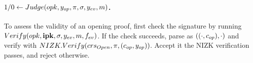 \paragraph{$1/0 \gets Judge(opk,y_{op},\pi,\sigma,y_{ev},m)$.} %
To assess the validity of an opening proof, first check the signature
by running $Verify(opk,\mathbf{ipk}, \sigma,y_{ev},m,f_{ev})$. If the check succeeds,
parse \sig as $((\cdot,c_{op}),\cdot)$ and verify \NIZKproof with $NIZK.Verify
(crs_{Open},\pi,(c_{op},y_{op}))$. Accept it the NIZK
verification passes, and reject otherwise.

%

